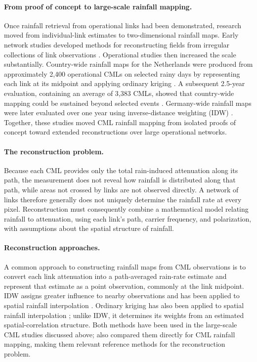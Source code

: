 \documentclass[11pt]{article}
\begin{document}
\paragraph*{From proof of concept to large-scale rainfall mapping.} Once rainfall retrieval from operational links had been demonstrated, research moved from individual-link estimates to two-dimensional rainfall maps. Early network studies developed methods for reconstructing fields from irregular collections of link observations \citep{zinevich2008rainfall,goldshtein2009rain}. Operational studies then increased the scale substantially. Country-wide rainfall maps for the Netherlands were produced from approximately 2,400 operational CMLs on selected rainy days by representing each link at its midpoint and applying ordinary kriging \citep{overeem2013countrywide}. A subsequent 2.5-year evaluation, containing an average of 3,383 CMLs, showed that country-wide mapping could be sustained beyond selected events \citep{overeem2016countrywide}. Germany-wide rainfall maps were later evaluated over one year using inverse-distance weighting (IDW) \citep{graf2020germanwide}. Together, these studies moved CML rainfall mapping from isolated proofs of concept toward extended reconstructions over large operational networks.

\paragraph*{The reconstruction problem.} Because each CML provides only the total rain-induced attenuation along its path, the measurement does not reveal how rainfall is distributed along that path, while areas not crossed by links are not observed directly. A network of links therefore generally does not uniquely determine the rainfall rate at every pixel. Reconstruction must consequently combine a mathematical model relating rainfall to attenuation, using each link's path, carrier frequency, and polarization, with assumptions about the spatial structure of rainfall.

\paragraph*{Reconstruction approaches.} A common approach to constructing rainfall maps from CML observations is to convert each link attenuation into a path-averaged rain-rate estimate and represent that estimate as a point observation, commonly at the link midpoint. IDW assigns greater influence to nearby observations and has been applied to spatial rainfall interpolation \citep{ahrens2006distance}. Ordinary kriging has also been applied to spatial rainfall interpolation \citep{ly2013spatial}; unlike IDW, it determines its weights from an estimated spatial-correlation structure. Both methods have been used in the large-scale CML studies discussed above; \citet{eshel2021interpolation} also compared them directly for CML rainfall mapping, making them relevant reference methods for the reconstruction problem.
\end{document}
